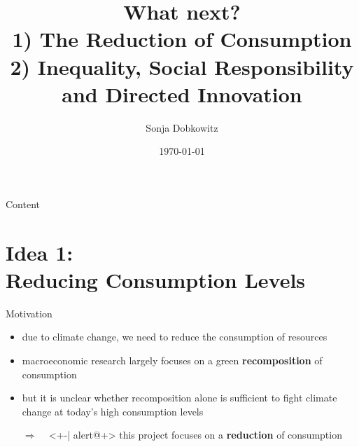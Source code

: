 \documentclass[11pt,aspectratio=169]{beamer}
\author[Sonja Dobkowitz]{\small Sonja Dobkowitz}
\institute[University of Bonn]{University of Bonn}
\title{What next? \\ \vspace{3mm} \small{1) The Reduction of Consumption}\\ \small{2) Inequality, Social Responsibility and Directed Innovation}}
\institute{University of Bonn}
\date{\today}
\newcommand{\ar}{$\Rightarrow$ \ }
\begin{document}
	
	{
		\begin{frame}
		\titlepage
	\end{frame}
}
\addtocounter{framenumber}{-1}

 {
 \begin{frame}{Content}
 \vspace{4mm}
 \tableofcontents
 \end{frame}
 }
 \addtocounter{framenumber}{-1}


\section{Idea 1: \\ Reducing Consumption Levels}
\begin{frame}{Motivation}

\begin{itemize}[<+-| alert@+>]
	
	\item<+-| alert@+> due to climate change, we need to reduce the consumption of resources
	\vspace{4mm}
	\item<+-| alert@+> macroeconomic research largely focuses on a green \textbf{\textcolor{cyan!100}{recomposition}} of consumption 
\vspace{4mm}
	\item<+-| alert@+>  but it is unclear whether recomposition alone is sufficient to fight climate change at today's high consumption levels%

\vspace{4mm}
	\item[\ar]<+-| alert@+>  this project focuses on a \textbf{\textcolor{cyan!100}{reduction}}  of consumption %
\end{itemize}
\end{frame}
\end{document}
